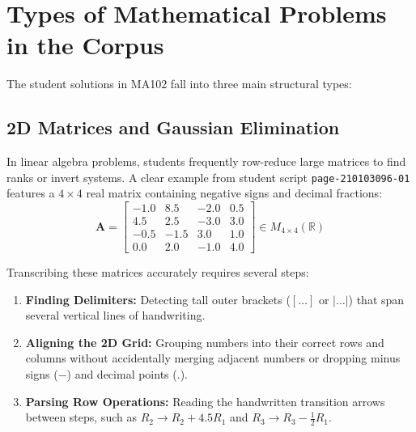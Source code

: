 \section{Types of Mathematical Problems in the Corpus}
\label{sec:math_taxonomy}

The student solutions in MA102 fall into three main structural types:

\subsection{2D Matrices and Gaussian Elimination}
In linear algebra problems, students frequently row-reduce large matrices to find ranks or invert systems. A clear example from student script \texttt{page-210103096-01} features a $4 \times 4$ real matrix containing negative signs and decimal fractions:
\begin{equation}
\label{eq:matrix_example}
\mathbf{A} = \begin{bmatrix}
-1.0 & 8.5 & -2.0 & 0.5 \\
4.5 & 2.5 & -3.0 & 3.0 \\
-0.5 & -1.5 & 3.0 & 1.0 \\
0.0 & 2.0 & -1.0 & 4.0
\end{bmatrix} \in M_{4 \times 4}(\mathbb{R})
\end{equation}

Transcribing these matrices accurately requires several steps:
\begin{enumerate}
    \item \textbf{Finding Delimiters:} Detecting tall outer brackets ($[ \dots ]$ or $| \dots |$) that span several vertical lines of handwriting.
    \item \textbf{Aligning the 2D Grid:} Grouping numbers into their correct rows and columns without accidentally merging adjacent numbers or dropping minus signs ($-$) and decimal points ($.$).
    \item \textbf{Parsing Row Operations:} Reading the handwritten transition arrows between steps, such as $R_2 \to R_2 + 4.5 R_1$ and $R_3 \to R_3 - \frac{1}{2} R_1$.
\end{enumerate}

